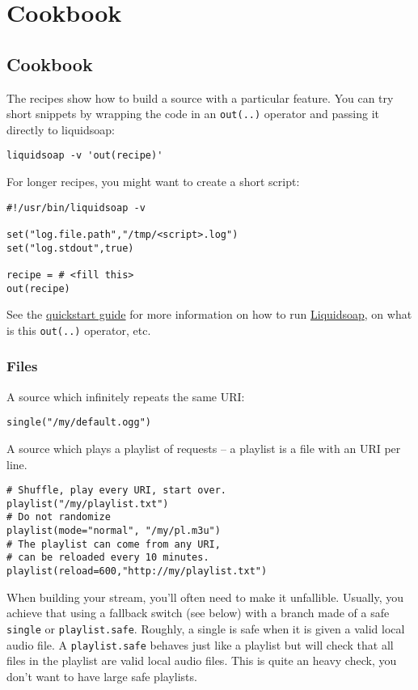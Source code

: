 \chapter{Cookbook}
\section{Cookbook}
The recipes show how to build a source with a particular feature. You can try short snippets by wrapping the code in an \verb+out(..)+ operator and passing it directly to liquidsoap:

\begin{verbatim}
liquidsoap -v 'out(recipe)'
\end{verbatim}
For longer recipes, you might want to create a short script:

\begin{verbatim}
#!/usr/bin/liquidsoap -v

set("log.file.path","/tmp/<script>.log")
set("log.stdout",true)

recipe = # <fill this>
out(recipe)
\end{verbatim}
See the \href{quick_start.html}{quickstart guide} for more information on how to run \href{index.html}{Liquidsoap}, on what is this \verb+out(..)+ operator, etc.

\subsection{Files}
A source which infinitely repeats the same URI:

\begin{verbatim}
single("/my/default.ogg")
\end{verbatim}
A source which plays a playlist of requests -- a playlist is a file with an URI per line.

\begin{verbatim}
# Shuffle, play every URI, start over.
playlist("/my/playlist.txt")
# Do not randomize
playlist(mode="normal", "/my/pl.m3u")
# The playlist can come from any URI,
# can be reloaded every 10 minutes.
playlist(reload=600,"http://my/playlist.txt")
\end{verbatim}
When building your stream, you'll often need to make it unfallible. Usually, you achieve that using a fallback switch (see below) with a branch made of a safe \verb+single+ or \verb+playlist.safe+. Roughly, a single is safe when it is given a valid local audio file. A \verb+playlist.safe+ behaves just like a playlist but will check that all files in the playlist are valid local audio files. This is quite an heavy check, you don't want to have large safe playlists.

